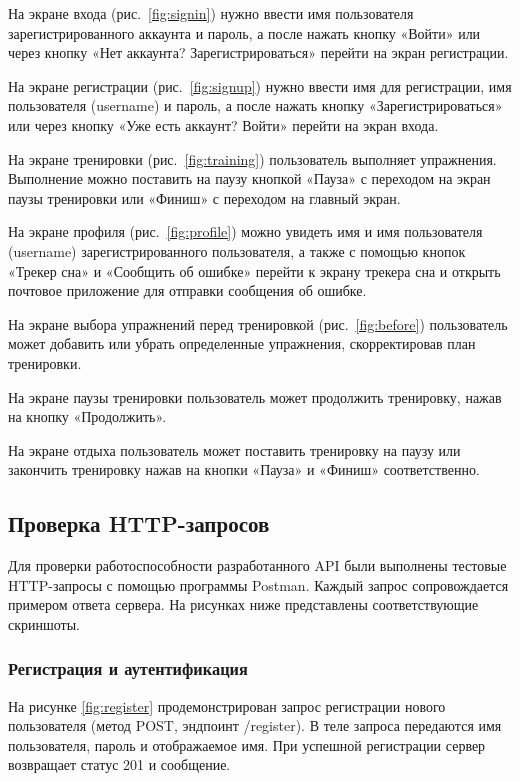 На экране входа (рис.~\ref{fig:signin}) нужно ввести имя пользователя зарегистрированного аккаунта и пароль, а после нажать кнопку «Войти» или через кнопку «Нет аккаунта? Зарегистрироваться» перейти на экран регистрации. 

На экране регистрации (рис.~\ref{fig:signup}) нужно ввести имя для регистрации, имя пользователя (username) и пароль, а после нажать кнопку «Зарегистрироваться» или через кнопку «Уже есть аккаунт? Войти» перейти на экран входа. 

На экране тренировки (рис.~\ref{fig:training}) пользователь выполняет упражнения. Выполнение можно поставить на паузу кнопкой «Пауза» с переходом на экран паузы тренировки или «Финиш» с переходом на главный экран. 

На экране профиля (рис.~\ref{fig:profile}) можно увидеть имя и имя пользователя (username) зарегистрированного пользователя, а также с помощью кнопок «Трекер сна» и «Сообщить об ошибке» перейти к экрану трекера сна и открыть почтовое приложение для отправки сообщения об ошибке. 

На экране выбора упражнений перед тренировкой (рис.~\ref{fig:before}) пользователь может добавить или убрать определенные упражнения, скорректировав план тренировки. 

На экране паузы тренировки пользователь может продолжить тренировку, нажав на кнопку «Продолжить».

На экране отдыха пользователь может поставить тренировку на паузу или закончить тренировку нажав на кнопки «Пауза» и «Финиш» соответственно. 

\subsection{Проверка HTTP-запросов}

Для проверки работоспособности разработанного API были выполнены тестовые HTTP-запросы с помощью программы Postman. Каждый запрос сопровождается примером ответа сервера. На рисунках ниже представлены соответствующие скриншоты.

\subsubsection{Регистрация и аутентификация}

На рисунке \ref{fig:register} продемонстрирован запрос регистрации нового пользователя (метод POST, эндпоинт /register). В теле запроса передаются имя пользователя, пароль и отображаемое имя. При успешной регистрации сервер возвращает статус 201 и сообщение.

